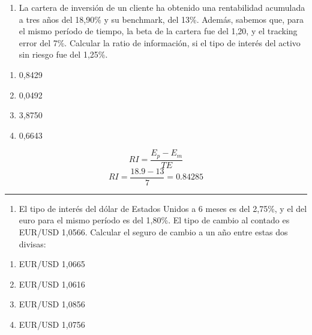 \documentclass[
  letterpaper,
  DIV=11,
  numbers=noendperiod]{scrreprt}
\providecommand{\tightlist}{%
  \setlength{\itemsep}{0pt}\setlength{\parskip}{0pt}}\usepackage{longtable,booktabs,array}
\begin{document}
\begin{tcolorbox}
\begin{enumerate}
\def\labelenumi{\arabic{enumi}.}
\setcounter{enumi}{11}
\tightlist
\item
  La cartera de inversión de un cliente ha obtenido una rentabilidad
  acumulada a tres años del 18,90\% y su benchmark, del 13\%. Además,
  sabemos que, para el mismo período de tiempo, la beta de la cartera
  fue del 1,20, y el tracking error del 7\%. Calcular la ratio de
  información, si el tipo de interés del activo sin riesgo fue del
  1,25\%.
\end{enumerate}

\begin{enumerate}
\def\labelenumi{\alph{enumi}.}
\item
  0,8429
\item
  0,0492
\item
  3,8750
\item
  0,6643
\end{enumerate}

\begin{tcolorbox}[enhanced jigsaw, toprule=.15mm, left=2mm, breakable, opacitybacktitle=0.6, toptitle=1mm, coltitle=black, arc=.35mm, leftrule=.75mm, bottomtitle=1mm, titlerule=0mm, title=\textcolor{quarto-callout-tip-color}{\faLightbulb}\hspace{0.5em}{Solución}, rightrule=.15mm, opacityback=0, bottomrule=.15mm, colback=white, colframe=quarto-callout-tip-color-frame, colbacktitle=quarto-callout-tip-color!10!white]

\[RI=\frac{E_p-E_m}{TE}\] \[RI=\frac{18.9-13}{7}=0.84285\]

\end{tcolorbox}

\begin{center}\rule{0.5\linewidth}{0.5pt}\end{center}

\begin{enumerate}
\def\labelenumi{\arabic{enumi}.}
\setcounter{enumi}{12}
\tightlist
\item
  El tipo de interés del dólar de Estados Unidos a 6 meses es del
  2,75\%, y el del euro para el mismo período es del 1,80\%. El tipo de
  cambio al contado es EUR/USD 1,0566. Calcular el seguro de cambio a un
  año entre estas dos divisas:
\end{enumerate}

\begin{enumerate}
\def\labelenumi{\alph{enumi}.}
\item
  EUR/USD 1,0665
\item
  EUR/USD 1,0616
\item
  EUR/USD 1,0856
\item
  EUR/USD 1,0756
\end{enumerate}


\end{tcolorbox}
\end{document}
